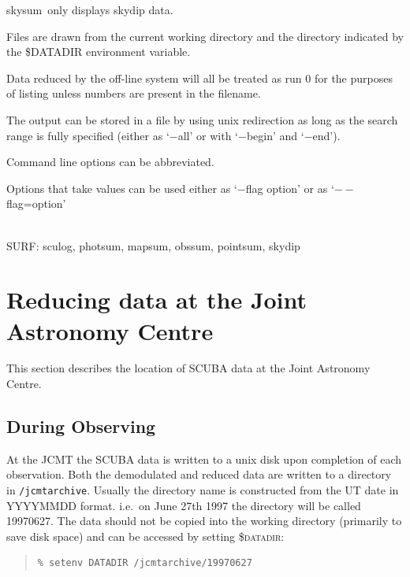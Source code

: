 \documentclass[twoside,11pt]{article}
\newcommand{\task}[1]{{\sf #1}}
\newcommand{\skydip}{\htmlref{\task{skydip}}{SKYDIP}}
\newcommand{\sculog}{\htmlref{\task{sculog}}{SCULOG}}
\newcommand{\photsum}{\htmlref{\task{photsum}}{PHOTSUM}}
\newcommand{\mapsum}{\htmlref{\task{mapsum}}{MAPSUM}}
\newcommand{\skysum}{\htmlref{\task{skysum}}{SKYSUM}}
\newcommand{\pointsum}{\htmlref{\task{pointsum}}{POINTSUM}}
\newcommand{\obssum}{\htmlref{\task{obssum}}{OBSSUM}}
\newenvironment{myquote}{\begin{quote}\begin{small}}{\end{small}\end{quote}}
\newcommand{\htmlref}[2]{#1}
\newcommand{\xlabel}[1]{}
\renewcommand{\_}{\texttt{\symbol{95}}}
\newcommand{\sstdiytopic}[2]{\item[{\hspace{-0.35em}#1\hspace{-0.35em}:}]
\mbox{} \\[1.3ex] #2}
\newcommand{\sstitem}{\item}
\newcommand{\sstdiytopic}[2]{\item[{#1}] #2 }
\newcommand{\sstitem}{\item}
\begin{document}
{{{         \sstitem
         \skysum\ only displays skydip data.

         \sstitem
         Files are drawn from the current working directory and the directory
           indicated by the \$DATADIR environment variable.   %

         \sstitem
         Data reduced by the off-line system will all be treated as
           run 0 for the purposes of listing unless numbers are present
           in the filename.

         \sstitem
         The output can be stored in a file by using unix redirection as
           long as the search range is fully specified (either as `$-$all' or
           with `$-$begin' and `$-$end').

         \sstitem
         Command line options can be abbreviated.

         \sstitem
         Options that take values can be used either as `$-$flag option' or
         as `$--$flag=option'
      }
   }
   \sstdiytopic{
      Related Applications
   }{
      SURF: \sculog, \photsum, \mapsum, \obssum, \pointsum, \skydip
   }
}




\clearpage

\section{\xlabel{JAC}Reducing data at the Joint Astronomy Centre\label{JAC}}

This section describes the location of SCUBA data at the Joint Astronomy
Centre.

\subsection{During Observing}

At the JCMT the SCUBA data is written to a unix disk upon completion of each
observation. Both the demodulated and reduced data are written to a directory
in \texttt{/jcmtarchive}. Usually the directory name is constructed from the
UT date in YYYYMMDD format. i.e.\ on June 27th 1997 the directory will be
called 19970627. The data should not be copied into the working directory
(primarily to save disk space) and can be accessed by setting
\textsc{\$datadir}:     %
\begin{myquote}
\begin{verbatim}
% setenv DATADIR /jcmtarchive/19970627
\end{verbatim}
\end{myquote}
\end{document}
